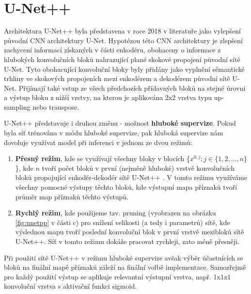 \section{U-Net++}
\label{sec:Chapter23}

Architektura U-Net++ byla představena v roce 2018 v literatuře \cite{unetpp} jako vylepšení původní CNN architektury U-Net. Hypotézou této CNN architektury je zlepšení zachycení informací získaných v části enkodéru, obohaceny o informace z hlubokých konvolučních bloků nahrazující plané skokové propojení původní sítě U-Net. Tyto obohacující konvoluční bloky byly přidány jako vyplnění sémantické trhliny ve skokových propojeních mezi enkodérem a dekodérem původní sítě U-Net. Přijímají také vstup ze všech předchozích přídavných bloků na stejné úrovni a výstup bloku z nižší vrstvy, na kterou je aplikována 2x2 vrstva typu up-sampling nebo transpose. 

U-Net++ představuje i druhou změnu - možnost \textbf{hluboké supervize}. Pokud byla síť trénována v módu hluboké supervize, pak hluboká supervize nám dovoluje využívat model při inferenci v jednom ze dvou režimů:

\begin{enumerate}
    \item \textbf{Přesný režim}, kde se využívají všechny bloky v blocích \{\(x^{0, j} \colon j \in \{1,2,...,n\}\)\}, kde \(n\) tvoří počet bloků v první (nejméně hluboké) vrstvě konvolučních bloků propojující enkodér-dekodér sítě U-Net++ \cite{unetpp}. V tomto režimu využíváme všechny pomocné výstupy těchto bloků, kde výstupní mapa příznaků tvoří průměr map příznaků těchto výstupů.
    \item \textbf{Rychlý režim}, kde použijeme tzv. pruning (vyobrazen na obrázku \ref{fig:unetpp} v části c) pro snížení velikosti (a tedy i parametrů) sítě, kde výslednou mapu tvoří poslední konvoluční blok v první vrstvě mezibloků sítě U-Net++. Síť v tomto režimu dokáže pracovat rychleji, zato méně přesněji.
\end{enumerate}

Při použití sítě U-Net++ v režimu hluboké supervize avšak výběr účastnících se bloků na finální mapě příznaků záleží na finální volbě implementace. Samozřejmě pro každý použití výstup se aplikuje relevantní výstupní vrstva, např. 1x1x1 konvoluční vrstva s aktivační funkci sigmoid.

